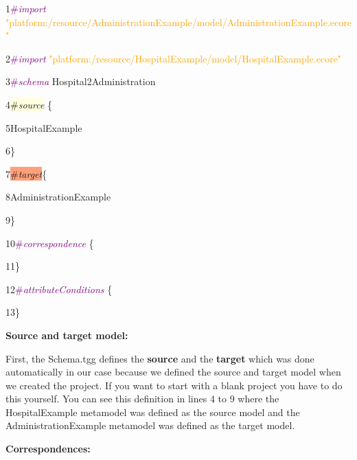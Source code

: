 {

1\hspace{0.5cm}\textcolor{Purple}{\#\textit{import}} \textcolor{Orange}{"platform:/resource/AdministrationExample/model/AdministrationExample.ecore"}

2\hspace{0.5cm}\textcolor{Purple}{\#\textit{import}} \textcolor{Orange}{"platform:/resource/HospitalExample/model/HospitalExample.ecore"}

3\hspace{0.5cm}\textcolor{Purple}{\#\textit{schema}} Hospital2Administration

4\hspace{0.5cm}\colorbox{LightYellow}{\#\textit{source}} \{

5\hspace{1cm}HospitalExample

6\hspace{0.5cm}\}

7\hspace{0.5cm}\colorbox{LightSalmon}{\#\textit{target}}\{ 

8\hspace{1cm}AdministrationExample

9\hspace{0.5cm}\} 

10\hspace{0.5cm}\textcolor{Purple}{\#\textit{correspondence}} \{

11\hspace{0.5cm}\}

12\hspace{0.5cm}\textcolor{Purple}{\#\textit{attributeConditions}} \{
	
13\hspace{0.5cm}\} \newline

}

\textbf{Source and target model:}

First, the Schema.tgg defines the \textbf{source} and the \textbf{target} which was done automatically in our case because we defined the source and target model when we created the project. If you want to start with a blank project you have to do this yourself. You can see this definition in lines 4 to 9 where the \textsf{HospitalExample} metamodel was defined as the source model and the \textsf{AdministrationExample} metamodel was defined as the target model.\newline

\textbf{Correspondences:}

